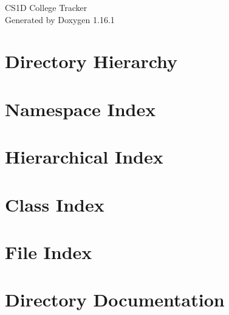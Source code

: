 \documentclass[twoside]{book}
\newcommand{\+}{\discretionary{\mbox{\scriptsize$\hookleftarrow$}}{}{}}
\newcommand{\clearemptydoublepage}{%
    \newpage{\pagestyle{empty}\cleardoublepage}%
  }
\begin{document}
  \raggedbottom
    \hypersetup{pageanchor=false,
                bookmarksnumbered=true,
                pdfencoding=unicode
               }
  \begin{titlepage}
  \vspace*{7cm}
  \begin{center}%
  {\Large CS1\+D College Tracker}\\
  \vspace*{1cm}
  {\large Generated by Doxygen 1.16.1}\\
  \end{center}
  \end{titlepage}
  \clearemptydoublepage
  \tableofcontents
  \clearemptydoublepage
  \hypersetup{pageanchor=true}
\chapter{Directory Hierarchy}

\chapter{Namespace Index}

\chapter{Hierarchical Index}

\chapter{Class Index}

\chapter{File Index}

\chapter{Directory Documentation}















\end{document}
